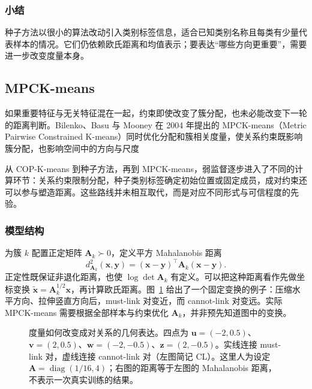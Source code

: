\subsubsection{小结}

种子方法以很小的算法改动引入类别标签信息，适合已知类别名称且每类有少量代表样本的情况。它们仍依赖欧氏距离和均值表示；要表达“哪些方向更重要”，需要进一步改变度量本身。

\subsection{MPCK-means}
\label{sec:clustering-mpck}

如果重要特征与无关特征混在一起，约束即使改变了簇分配，也未必能改变下一轮的距离判断。Bilenko、Basu 与 Mooney 在 2004 年提出的 MPCK-means（Metric Pairwise Constrained K-means）同时优化分配和簇相关度量，使关系约束既影响簇分配，也影响空间中的方向与尺度

从 COP-K-means 到种子方法，再到 MPCK-means，弱监督逐步进入了不同的计算环节：关系约束限制分配，种子类别标签确定初始位置或固定成员，成对约束还可以参与塑造距离。这些路线并未相互取代，而是对应不同形式与可信程度的先验。

\subsubsection{模型结构}

为簇 $k$ 配置正定矩阵 $\bm{A}_k\succ0$，定义平方 Mahalanobis 距离
\[
 d_{\bm{A}_k}^2(\bm{x},\bm{y})
 =(\bm{x}-\bm{y})^\top\bm{A}_k(\bm{x}-\bm{y}).
\]
正定性既保证非退化距离，也使 $\log\det\bm{A}_k$ 有定义。可以把这种距离看作先做坐标变换 $\tilde{\bm{x}}=\bm{A}_k^{1/2}\bm{x}$，再计算欧氏距离。图~\ref{fig:clustering-metric-constraints} 给出了一个固定变换的例子：压缩水平方向、拉伸竖直方向后，must-link 对变近，而 cannot-link 对变远。实际 MPCK-means 需要根据全部样本与约束优化 $\bm{A}_k$，并非预先知道图中的变换。

\begin{figure}[htbp]
 \centering
 
 \caption{度量如何改变成对关系的几何表达。四点为 $\bm{u}=(-2,0.5)$、$\bm{v}=(2,0.5)$、$\bm{w}=(-2,-0.5)$、$\bm{z}=(2,-0.5)$。实线连接 must-link 对，虚线连接 cannot-link 对（左图简记 CL）。这里人为设定 $\bm{A}=\operatorname{diag}(1/16,4)$；右图的距离等于左图的 Mahalanobis 距离，不表示一次真实训练的结果。}
 \label{fig:clustering-metric-constraints}
\end{figure}

